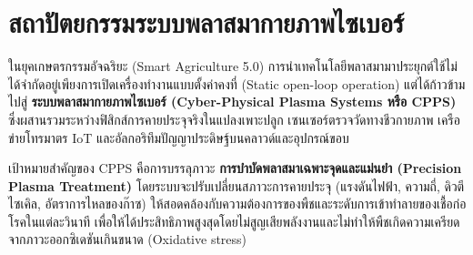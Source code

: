 \clearpage


\section{สถาปัตยกรรมระบบพลาสมากายภาพไซเบอร์}

ในยุคเกษตรกรรมอัจฉริยะ (Smart Agriculture 5.0) การนำเทคโนโลยีพลาสมามาประยุกต์ใช้ไม่ได้จำกัดอยู่เพียงการเปิดเครื่องทำงานแบบตั้งค่าคงที่ (Static open-loop operation) แต่ได้ก้าวข้ามไปสู่ \textbf{ระบบพลาสมากายภาพไซเบอร์ (Cyber-Physical Plasma Systems หรือ CPPS)} ซึ่งผสานรวมระหว่างฟิสิกส์การคายประจุจริงในแปลงเพาะปลูก เซนเซอร์ตรวจวัดทางชีวกายภาพ เครือข่ายโทรมาตร IoT และอัลกอริทึมปัญญาประดิษฐ์บนคลาวด์และอุปกรณ์ขอบ

เป้าหมายสำคัญของ CPPS คือการบรรลุภาวะ \textbf{การบำบัดพลาสมาเฉพาะจุดและแม่นยำ (Precision Plasma Treatment)} โดยระบบจะปรับเปลี่ยนสภาวะการคายประจุ (แรงดันไฟฟ้า, ความถี่, ดิวตีไซเคิล, อัตราการไหลของก๊าซ) ให้สอดคล้องกับความต้องการของพืชและระดับการเข้าทำลายของเชื้อก่อโรคในแต่ละวินาที เพื่อให้ได้ประสิทธิภาพสูงสุดโดยไม่สูญเสียพลังงานและไม่ทำให้พืชเกิดความเครียดจากภาวะออกซิเดชันเกินขนาด (Oxidative stress)

